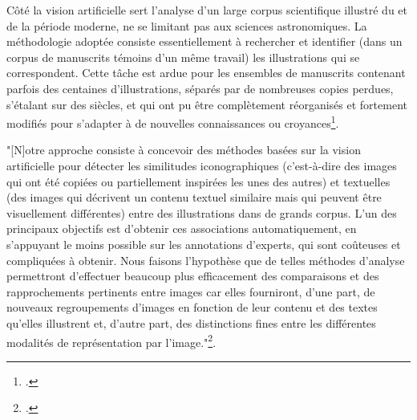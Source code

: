 Côté \vhs la vision artificielle sert l'analyse d'un large corpus
scientifique illustré du \ma et de la période moderne, ne se
limitant pas aux sciences astronomiques. La méthodologie adoptée
consiste essentiellement à rechercher et identifier (dans un corpus de
manuscrits témoins d'un même travail) les illustrations qui se
correspondent. Cette tâche est ardue pour les ensembles de manuscrits
contenant parfois des centaines d'illustrations, séparés par de
nombreuses copies perdues, s'étalant sur des siècles, et qui ont pu être
complètement réorganisés et fortement modifiés pour s'adapter à de
nouvelles connaissances ou croyances\footcite[``Most research on the
  automatic analysis of manuscripts and particularly their alignment,
  also known as collation, has focused on text. However, illustrations
  are a crucial part of some documents, hinting the copyist values,
  knowledge and beliefs and are thus of major interest to historians.
  One might naively think that these illustrations are much easier to
  align than text and that a specialist can identify them in a matter of
  seconds. This is only true in the simplest of cases, where the order
  of the illustrations is preserved and their content relatively
  similar. In harder cases however, the task becomes daunting and is one
  of the important limiting factor for a large scale analysis.''][p.1]{kaoua_image_2021}.

\begin{kwote}
"{[}N{]}otre approche consiste à concevoir des méthodes basées sur la
vision artificielle pour détecter les similitudes iconographiques
(c'est-à-dire des images qui ont été copiées ou partiellement inspirées
les unes des autres) et textuelles (des images qui décrivent un contenu
textuel similaire mais qui peuvent être visuellement différentes) entre
des illustrations dans de grands corpus. L'un des principaux objectifs
est d'obtenir ces associations automatiquement, en s'appuyant le moins
possible sur les annotations d'experts, qui sont coûteuses et
compliquées à obtenir. Nous faisons l'hypothèse que de telles méthodes
d'analyse permettront d'effectuer beaucoup plus efficacement des
comparaisons et des rapprochements pertinents entre images car elles
fourniront, d'une part, de nouveaux regroupements d'images en fonction
de leur contenu et des textes qu'elles illustrent et, d'autre part, des
distinctions fines entre les différentes modalités de représentation par
l'image."\footcite{noauthor_vision_nodate}.
\end{kwote}       

